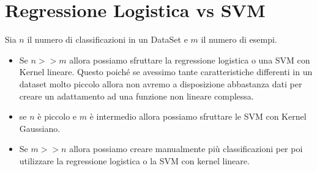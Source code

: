\section{Regressione Logistica vs SVM}
Sia $n$ il numero di classificazioni in un DataSet e $m$ il numero di esempi. 
\begin{itemize}
    \item Se $n >> m$ allora possiamo sfruttare la regressione logistica o una SVM con Kernel lineare. Questo poiché se avessimo tante caratteristiche differenti in un dataset molto piccolo allora non avremo a disposizione abbastanza dati per creare un adattamento ad una funzione non lineare complessa.
    \item se $n$ è  piccolo e $m$ è intermedio allora possiamo sfruttare le SVM con Kernel Gaussiano.
    \item Se $m >> n$ allora possiamo creare manualmente più classificazioni per poi utilizzare la regressione logistica o la SVM con kernel lineare.
\end{itemize}




